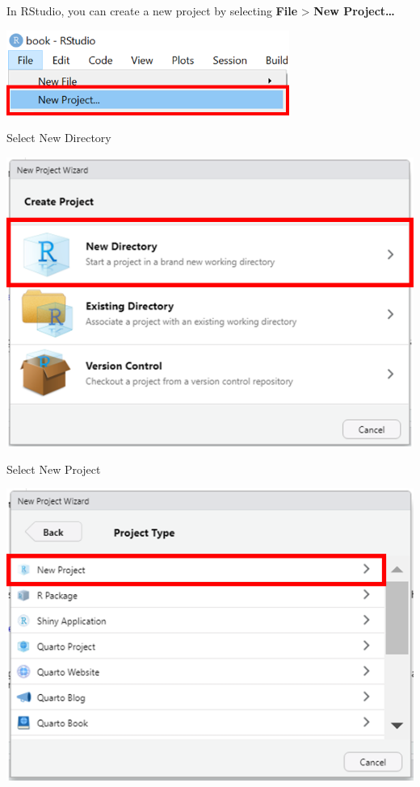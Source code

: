 \documentclass[
  letterpaper,
  DIV=11,
  numbers=noendperiod,
  oneside]{scrreprt}
\begin{document}
In RStudio, you can create a new project by selecting \textbf{File}
\textgreater{} \textbf{New Project\ldots{}}

\includegraphics[width=3.64583in,height=\textheight]{images/paste-CCA1D5A5.png}

Select New Directory

\includegraphics{images/paste-DCC39BB5.png}

Select New Project

\includegraphics{images/paste-30A4402B.png}
\end{document}
